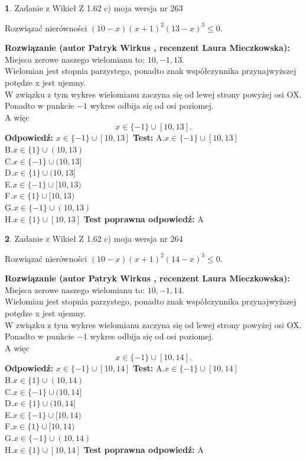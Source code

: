 \documentclass[12pt, a4paper]{article}
\theoremstyle{definition} %
\newtheorem{zad}{}
\newcommand{\zadStart}[1]{\begin{zad}#1\newline}
\newcommand{\zadStop}{\end{zad}}
\newcommand{\rozwStart}[2]{\noindent \textbf{Rozwiązanie (autor #1 , recenzent #2): }\newline}
\newcommand{\rozwStop}{\newline}
\newcommand{\odpStart}{\noindent \textbf{Odpowiedź:}\newline}
\newcommand{\odpStop}{\newline}
\newcommand{\testStart}{\noindent \textbf{Test:}\newline}
\newcommand{\testStop}{\newline}
\newcommand{\kluczStart}{\noindent \textbf{Test poprawna odpowiedź:}\newline}
\newcommand{\kluczStop}{\newline}
\begin{document}
\zadStart{Zadanie z Wikieł Z 1.62 c) moja wersja nr 263}

Rozwiązać nierówności $(10-x)(x+1)^{2}(13-x)^{3}\le0$.
\zadStop
\rozwStart{Patryk Wirkus}{Laura Mieczkowska}
Miejsca zerowe naszego wielomianu to: $10, -1, 13$.\\
Wielomian jest stopnia parzystego, ponadto znak współczynnika przy\linebreak najwyższej potędze x jest ujemny.\\ W związku z tym wykres wielomianu zaczyna się od lewej strony powyżej osi OX.\\
Ponadto w punkcie $-1$ wykres odbija się od osi poziomej.\\
A więc $$x \in \{-1\} \cup [10,13].$$
\rozwStop
\odpStart
$x \in \{-1\} \cup [10,13]$
\odpStop
\testStart
A.$x \in \{-1\} \cup [10,13]$\\
B.$x \in \{1\} \cup (10,13)$\\
C.$x \in \{-1\} \cup (10,13]$\\
D.$x \in \{1\} \cup (10,13]$\\
E.$x \in \{-1\} \cup [10,13)$\\
F.$x \in \{1\} \cup [10,13)$\\
G.$x \in \{-1\} \cup (10,13)$\\
H.$x \in \{1\} \cup [10,13]$
\testStop
\kluczStart
A
\kluczStop



\zadStart{Zadanie z Wikieł Z 1.62 c) moja wersja nr 264}

Rozwiązać nierówności $(10-x)(x+1)^{2}(14-x)^{3}\le0$.
\zadStop
\rozwStart{Patryk Wirkus}{Laura Mieczkowska}
Miejsca zerowe naszego wielomianu to: $10, -1, 14$.\\
Wielomian jest stopnia parzystego, ponadto znak współczynnika przy\linebreak najwyższej potędze x jest ujemny.\\ W związku z tym wykres wielomianu zaczyna się od lewej strony powyżej osi OX.\\
Ponadto w punkcie $-1$ wykres odbija się od osi poziomej.\\
A więc $$x \in \{-1\} \cup [10,14].$$
\rozwStop
\odpStart
$x \in \{-1\} \cup [10,14]$
\odpStop
\testStart
A.$x \in \{-1\} \cup [10,14]$\\
B.$x \in \{1\} \cup (10,14)$\\
C.$x \in \{-1\} \cup (10,14]$\\
D.$x \in \{1\} \cup (10,14]$\\
E.$x \in \{-1\} \cup [10,14)$\\
F.$x \in \{1\} \cup [10,14)$\\
G.$x \in \{-1\} \cup (10,14)$\\
H.$x \in \{1\} \cup [10,14]$
\testStop
\kluczStart
A
\kluczStop
\end{document}
